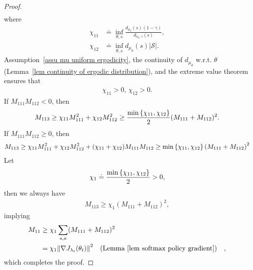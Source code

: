 \documentclass[twoside,11pt]{article}
\newcommand{\fS}{\mathcal{S}}
\newcommand{\ns}{{|\fS|}}
\numberwithin{assucounter}{section}
\begin{document}
\begin{proof}
\begin{align}
\end{align}
where 
\begin{align}
    \chi_{11} &\doteq \inf_{\theta, s} \frac{d_{\mu_{\theta}}(s) (1 - \gamma)}{d_{\pi_{\theta}, \gamma}(s)}, \\
    \chi_{12} &\doteq \inf_{\theta, s} {d_{\mu_{\theta}}(s) \ns}.
\end{align}
Assumption~\ref{assu mu uniform ergodicity},
the continuity of $d_{\mu_\theta}$ w.r.t. $\theta$ (Lemma~\ref{lem continuity of ergodic distribution}),
and the extreme value theorem ensures that
\begin{align}
  \chi_{11} > 0, \, \chi_{12} > 0.
\end{align}
If $M_{111}M_{112} < 0$,
then 
\begin{align}
  M_{113} \geq \chi_{11} M_{111}^2 +  \chi_{12} M_{112}^2 \geq \frac{\min\qty{\chi_{11}, \chi_{12}}}{2}(M_{111}+M_{112})^2.
\end{align}
If $M_{111}M_{112} \geq 0$,
then
\begin{align}
  M_{113} \geq \chi_{11} M_{111}^2 +  \chi_{12} M_{112}^2 + (\chi_{11} + \chi_{12})M_{111}M_{112} \geq \min\qty{\chi_{11}, \chi_{12}} (M_{111}+M_{112})^2
\end{align}
Let 
\begin{align}
  \chi_1 \doteq \frac{\min\qty{\chi_{11}, \chi_{12}}}{2} > 0,
\end{align}
then we always have
\begin{align}
  M_{113} \geq \chi_1 (M_{111}+M_{112})^2,
\end{align}
implying
\begin{align}
  M_{11} &\geq \chi_1 \sum_{s,a} (M_{111} + M_{112})^2 \\
  &= \chi_1 \norm{\nabla J_{\lambda_t}(\theta_t)}^2 \qq{(Lemma~\ref{lem softmax policy gradient})},
\end{align}
which completes the proof.
\end{proof}
\end{document}
